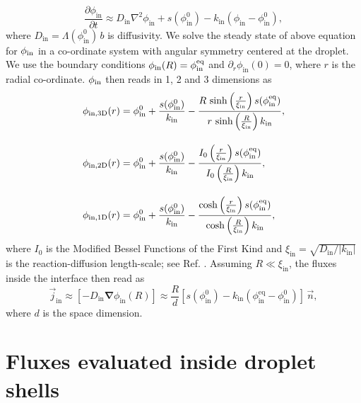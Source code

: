 \begin{appendices}
\begin{equation*}
    \frac{\partial \phi_\mathrm{in}}{\partial t}
    \approx D_\mathrm{in} \nabla ^2 \phi_\mathrm{in} +
    s(\phi^{0}_\mathrm{in})
    - k_{\mathrm{in}}(\phi_\mathrm{in} - \phi^{0}_\mathrm{in}),
\end{equation*}
where $D_\mathrm{in} = \Lambda(\phi^0_\mathrm{in})\,b$ is diffusivity.
We solve the steady state of above equation for $\phi_\mathrm{in}$ in a co-ordinate system with angular symmetry centered at the droplet.
We use the boundary conditions $\phi_\mathrm{in}(R) = \phi^\mathrm{eq}_\mathrm{in}$ and $\partial_r \phi_\mathrm{in}(0) = 0$, where $r$ is the radial co-ordinate. 
$\phi_\mathrm{in}$ then reads in 1, 2 and 3 dimensions as
\begin{subequations}
\label{eqn:fluxes_outside_appendix}
\begin{align}
    \phi_\mathrm{in,3 \mathrm{D}}(r) &= \phi^0_\mathrm{in} + \frac{s(\phi^0_\mathrm{in})}{k_\mathrm{in}} - \frac{R\,\sinh \left(\frac{r}{\xi_\mathrm{in} }\right) s(\phiEqIn)}{r\ \text{sinh}\left(\frac{R}{\xi_\mathrm{in}}\right) k_\mathrm{in}},
    \\[10pt]
    \phi_\mathrm{in,2 \mathrm{D}}(r) &= \phi^0_\mathrm{in} + \frac{s(\phi^0_\mathrm{in})}{k_\mathrm{in}} - \frac{ I_0\left(\frac{r}{\xi_\mathrm{in} }\right) s(\phiEqIn)}{I_0\left(\frac{R}{\xi_\mathrm{in} }\right) k_\mathrm{in} },
    \\[10pt]
    \phi_\mathrm{in,1 \mathrm{D}}(r) &= \phi^0_\mathrm{in} + \frac{s(\phi^0_\mathrm{in})}{k_\mathrm{in}} - \frac{\cosh \left(\frac{r}{\xi_\mathrm{in} }\right) s(\phiEqIn)}{\text{cosh}\left(\frac{R}{\xi_\mathrm{in} }\right) k_\mathrm{in} },
\end{align}
\end{subequations}
where $I_0$ is the Modified Bessel Functions of the First Kind and $\xi_\mathrm{in} = \sqrt{D_\mathrm{in}/|k_\mathrm{in}|}$ is the reaction-diffusion length-scale; see Ref. \cite{Review2019}.
Assuming $R \ll \xi_\mathrm{in}$,
the fluxes inside the interface then read as \begin{equation}
    \vec{j}_\mathrm{in} \approx [-D_\mathrm{in} {\boldsymbol{\nabla}} \phi_\mathrm{in}(R)] \approx \frac{R}{d} \left [ s(\phi^{0}_\mathrm{in})
    - k_{\mathrm{in}}(\phi^\mathrm{eq}_\mathrm{in} - \phi^{0}_\mathrm{in}) \right ] \,\vec{n},
\end{equation}
where $d$ is the space dimension.


\chapter{Fluxes evaluated inside droplet shells}


\end{appendices}
